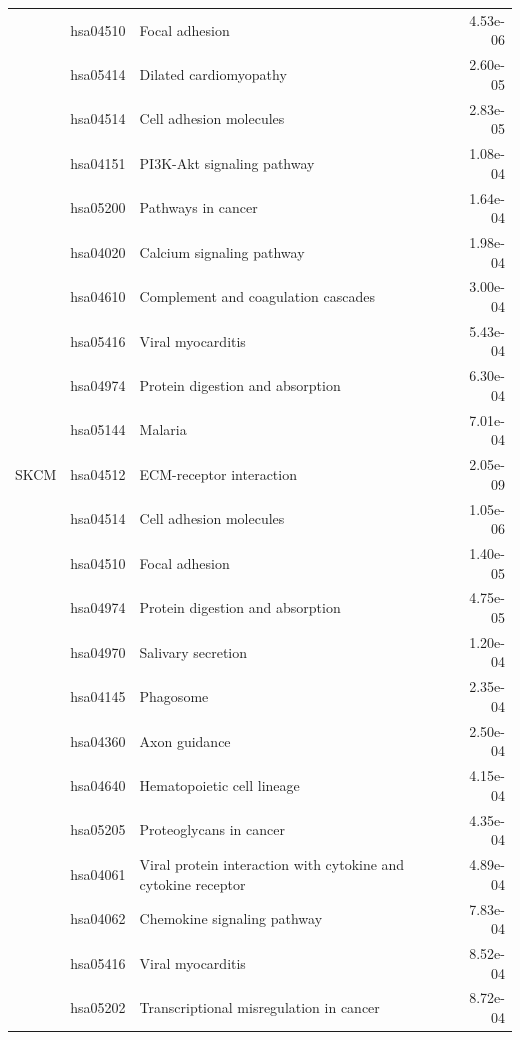 \begin{longtable}{cllr}
 \rowcolor{\clrmatch}& hsa04510 & Focal adhesion & 4.53e-06 \\ 
 & hsa05414 & \textcolor{\clrnew}{Dilated cardiomyopathy} & 2.60e-05 \\ 
 & hsa04514 & \textcolor{\clrnew}{Cell adhesion molecules} & 2.83e-05 \\ 
 \rowcolor{\clrmatch}& hsa04151 & PI3K-Akt signaling pathway & 1.08e-04 \\ 
 & hsa05200 & \textcolor{\clrnew}{Pathways in cancer} & 1.64e-04 \\ 
 & hsa04020 & \textcolor{\clrnew}{Calcium signaling pathway} & 1.98e-04 \\ 
 & hsa04610 & \textcolor{\clrnew}{Complement and coagulation cascades} & 3.00e-04 \\ 
 & hsa05416 & \textcolor{\clrnew}{Viral myocarditis} & 5.43e-04 \\ 
 \rowcolor{\clrmatch}& hsa04974 & Protein digestion and absorption & 6.30e-04 \\ 
 & hsa05144 & \textcolor{\clrnew}{Malaria} & 7.01e-04 \\ 
\midrule 
\rowcolor{\clrmatch}SKCM & hsa04512 & ECM-receptor interaction & 2.05e-09\\ 
 & hsa04514 & \textcolor{\clrnew}{Cell adhesion molecules} & 1.05e-06 \\ 
 \rowcolor{\clrmatch}& hsa04510 & Focal adhesion & 1.40e-05 \\ 
 \rowcolor{\clrmatch}& hsa04974 & Protein digestion and absorption & 4.75e-05 \\ 
 & hsa04970 & \textcolor{\clrnew}{Salivary secretion} & 1.20e-04 \\ 
 & hsa04145 & \textcolor{\clrnew}{Phagosome} & 2.35e-04 \\ 
 & hsa04360 & \textcolor{\clrnew}{Axon guidance} & 2.50e-04 \\ 
 & hsa04640 & \textcolor{\clrnew}{Hematopoietic cell lineage} & 4.15e-04 \\ 
 & hsa05205 & \textcolor{\clrnew}{Proteoglycans in cancer} & 4.35e-04 \\ 
 & hsa04061 & \textcolor{\clrnew}{Viral protein interaction with cytokine and cytokine receptor} & 4.89e-04 \\ 
 & hsa04062 & \textcolor{\clrnew}{Chemokine signaling pathway} & 7.83e-04 \\ 
 & hsa05416 & \textcolor{\clrnew}{Viral myocarditis} & 8.52e-04 \\ 
 & hsa05202 & \textcolor{\clrnew}{Transcriptional misregulation in cancer} & 8.72e-04 \\ 

\end{longtable}
